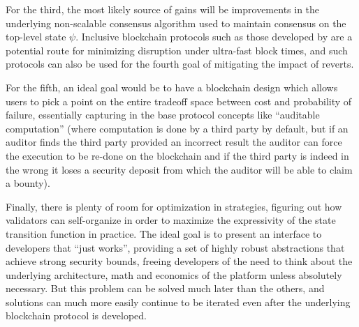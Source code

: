\documentclass[11pt,a4paper]{report}
\theoremstyle{plain}
\theoremstyle{definition}
\theoremstyle{remark}
\begin{document}
For the third, the most likely source of gains will be improvements in the underlying non-scalable consensus algorithm used to maintain consensus on the top-level state $\psi$. Inclusive blockchain protocols such as those developed by \cite{lewenberg_inclusive_2015} are a potential route for minimizing disruption under ultra-fast block times, and such protocols can also be used for the fourth goal of mitigating the impact of reverts.

For the fifth, an ideal goal would be to have a blockchain design which allows users to pick a point on the entire tradeoff space between cost and probability of failure, essentially capturing in the base protocol concepts like ``auditable computation'' \citep{buterin_scalability_2014} (where computation is done by a third party by default, but if an auditor finds the third party provided an incorrect result the auditor can force the execution to be re-done on the blockchain and if the third party is indeed in the wrong it loses a security deposit from which the auditor will be able to claim a bounty).

Finally, there is plenty of room for optimization in strategies, figuring out how validators can self-organize in order to maximize the expressivity of the state transition function in practice. The ideal goal is to present an interface to developers that ``just works'', providing a set of highly robust abstractions that achieve strong security bounds, freeing developers of the need to think about the underlying architecture, math and economics of the platform unless absolutely necessary. But this problem can be solved much later than the others, and solutions can much more easily continue to be iterated even after the underlying blockchain protocol is developed.

\medskip



\end{document}
